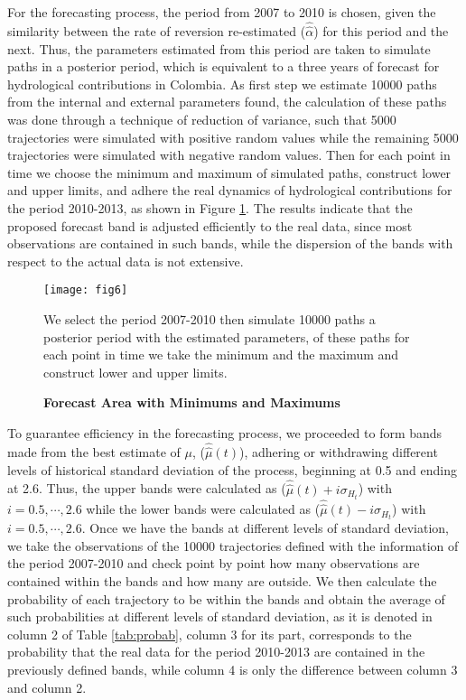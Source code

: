 \documentclass[12pt,halfline,a4paper]{ouparticle}
\begin{document}
For the forecasting process, the period from 2007 to 2010 is chosen, given the similarity between the rate of reversion re-estimated ($\hat{\hat{\alpha}}$) for this period and the next. Thus, the parameters estimated from this period are taken to simulate paths in a posterior period, which is equivalent to a three years of forecast for hydrological contributions in Colombia. As first step we estimate 10000 paths from the internal and external parameters found, the calculation of these paths was done through a technique of reduction of variance, such that 5000 trajectories were simulated with positive random values while the remaining 5000 trajectories were simulated with negative random values. Then for each point in time we choose the minimum and maximum of simulated paths, construct lower and upper limits, and adhere the real dynamics of hydrological contributions for the period 2010-2013, as shown in Figure \ref{fig:6}. The results indicate that the proposed forecast band is adjusted efficiently to the real data, since most observations are contained in such bands, while the dispersion of the bands with respect to the actual data is not extensive.

\begin{figure}[h]
	\centering
	\texttt{[image: fig6]}
	\caption{\textbf{Forecast Area with Minimums and Maximums}}
	\medskip
	\begin{minipage}{0.8\textwidth} 
		{\footnotesize{We select the period 2007-2010 then simulate 10000 paths a posterior period with the estimated parameters, of these paths for each point in time we take the minimum and the maximum and construct lower and upper limits.\par}}
	\end{minipage}
	\label{fig:6}
\end{figure}

To guarantee efficiency in the forecasting process, we proceeded to form bands made from the best estimate of $\mu$, ($\hat{\hat{\mu}}(t)$), adhering or withdrawing different levels of historical standard deviation of the process, beginning at 0.5 and ending at 2.6. Thus, the upper bands were calculated as ($\hat{\hat{\mu}}(t)+i\sigma_{H_{t}}$) with $i=0.5,\cdots,2.6$ while the lower bands were calculated as ($\hat{\hat{\mu}}(t)-i\sigma_{H_{t}}$) with $i=0.5,\cdots,2.6$. Once we have the bands at different levels of standard deviation, we take the observations of the 10000 trajectories defined with the information of the period 2007-2010 and check point by point how many observations are contained within the bands and how many are outside. We then calculate the probability of each trajectory to be within the bands and obtain the average of such probabilities at different levels of standard deviation, as it is denoted in column 2 of Table \ref{tab:probab}, column 3 for its part, corresponds to the probability that the real data for the period 2010-2013 are contained in the previously defined bands, while column 4 is only the difference between column 3 and column 2.
\end{document}
